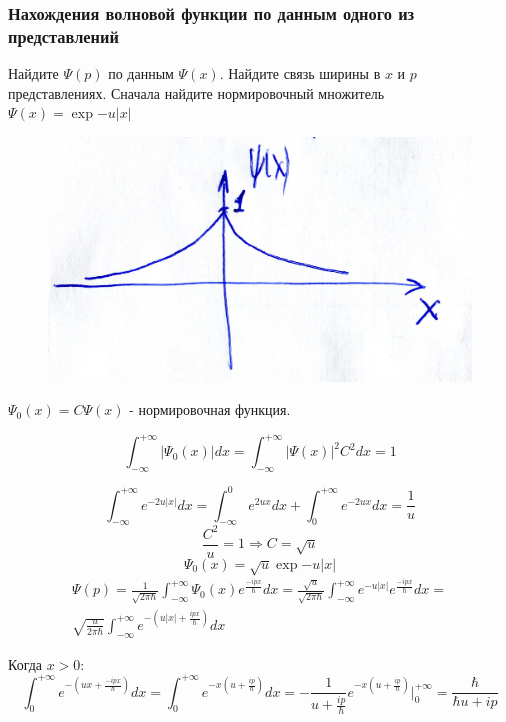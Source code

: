 \subsubsection{Нахождения волновой функции по данным одного из представлений}

Найдите $\Psi(p)$ по данным $\Psi(x)$. Найдите связь ширины в $x$ и $p$ представлениях. Сначала найдите нормировочный множитель $\Psi(x)=\exp{-u|x|}$


\begin{figure}
\includegraphics[width=\linewidth]{fig/fig73}
\caption{}
\vspace{-17pt}
\end{figure}

$\Psi_0(x)=C\Psi(x)$ - нормировочная функция.

$$\int_{-\infty}^{+\infty}|\Psi_0(x)|dx = \int_{-\infty}^{+\infty}|\Psi(x)|^2C^2dx=1$$

$$\int_{-\infty}^{+\infty} e^{-2u|x|}dx=\int_{-\infty}^{0} e^{2ux}dx+\int_{0}^{+\infty} e^{-2ux}dx=\frac{1}{u}$$
$$\frac{C^2}{u}=1 \Longrightarrow C=\sqrt{u}$$
$$\Psi_0(x)=\sqrt{u}\exp{-u|x|}$$
\begin{gather*}
 \Psi(p)=\frac{1}{\sqrt{2\pi \hbar}}\int_{-\infty}^{+\infty} \Psi_0(x) e^{\frac{-ipx}{\hbar}}dx=\frac{\sqrt{u}}{\sqrt{2\pi \hbar}}\int_{-\infty}^{+\infty} e^{-u|x|} e^{\frac{-ipx}{\hbar}}dx=\\
 \sqrt{\frac{u}{2\pi \hbar}}\int_{-\infty}^{+\infty} e^{-(u|x|+\frac{ipx}{\hbar})}dx
\end{gather*}

Когда $x>0$:
$$\int_{0}^{+\infty} e^{-(ux+\frac{-ipx}{\hbar})}dx=\int_{0}^{+\infty} e^{-x(u+\frac{ip}{\hbar})}dx=-\frac{1}{u+\frac{ip}{\hbar}}e^{-x(u+\frac{ip}{\hbar})} \bigg|_0^{+\infty}=\frac{\hbar}{\hbar u+ip}$$

